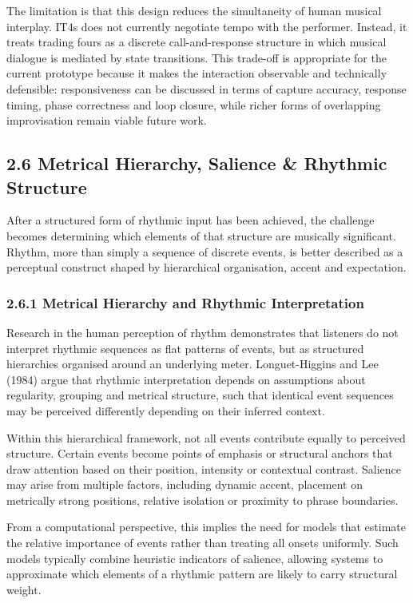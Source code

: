 The limitation is that this design reduces the simultaneity of human
musical interplay. IT4s does not currently negotiate tempo with the
performer. Instead, it treats trading fours as a discrete
call-and-response structure in which musical dialogue is mediated by
state transitions. This trade-off is appropriate for the current
prototype because it makes the interaction observable and technically
defensible: responsiveness can be discussed in terms of capture
accuracy, response timing, phase correctness and loop closure, while
richer forms of overlapping improvisation remain viable future work.

\subsection{2.6 Metrical Hierarchy, Salience \& Rhythmic
Structure}\label{metrical-hierarchy-salience-rhythmic-structure}

After a structured form of rhythmic input has been achieved, the
challenge becomes determining which elements of that structure are
musically significant. Rhythm, more than simply a sequence of discrete
events, is better described as a perceptual construct shaped by
hierarchical organisation, accent and expectation.

\subsubsection{2.6.1 Metrical Hierarchy and Rhythmic
Interpretation}\label{metrical-hierarchy-and-rhythmic-interpretation}

Research in the human perception of rhythm demonstrates that listeners
do not interpret rhythmic sequences as flat patterns of events, but as
structured hierarchies organised around an underlying meter.
Longuet-Higgins and Lee (1984) argue that rhythmic interpretation
depends on assumptions about regularity, grouping and metrical
structure, such that identical event sequences may be perceived
differently depending on their inferred context.

Within this hierarchical framework, not all events contribute equally to
perceived structure. Certain events become points of emphasis or
structural anchors that draw attention based on their position,
intensity or contextual contrast. Salience may arise from multiple
factors, including dynamic accent, placement on metrically strong
positions, relative isolation or proximity to phrase boundaries.

From a computational perspective, this implies the need for models that
estimate the relative importance of events rather than treating all
onsets uniformly. Such models typically combine heuristic indicators of
salience, allowing systems to approximate which elements of a rhythmic
pattern are likely to carry structural weight.

